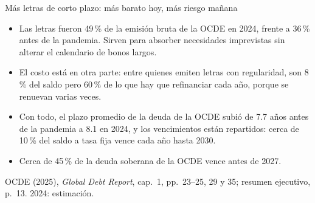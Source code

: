 \documentclass[aspectratio=169,11pt]{beamer}
\newcommand{\fuente}[1]{\par\vfill{\small\color{cGris}#1\par}}
\newcommand{\GDR}{OCDE (2025), \emph{Global Debt Report}}
\begin{document}
\begin{frame}{Más letras de corto plazo: más barato hoy, más riesgo mañana}
  \small
  \begin{itemize}
    \item<1-> Las letras fueron 49\,\% de la emisión bruta de la OCDE en 2024, frente a 36\,\% antes de la pandemia. Sirven para absorber necesidades imprevistas sin alterar el calendario de bonos largos.
    \item<2-> El costo está en otra parte: entre quienes emiten letras con regularidad, son 8\,\% del saldo pero 60\,\% de lo que hay que refinanciar cada año, porque se renuevan varias veces.
    \item<3-> Con todo, el plazo promedio de la deuda de la OCDE subió de 7.7 años antes de la pandemia a 8.1 en 2024, y los vencimientos están repartidos: cerca de 10\,\% del saldo a tasa fija vence cada año hasta 2030.
    \item<4-> Cerca de 45\,\% de la deuda soberana de la OCDE vence antes de 2027.
  \end{itemize}
  \fuente{\GDR, cap.~1, pp.~23--25, 29 y 35; resumen ejecutivo, p.~13. 2024: estimación.}
\end{frame}
\end{document}
